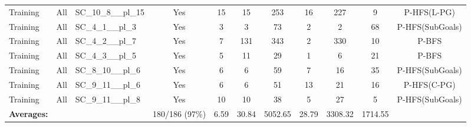 \documentclass{article}
\begin{document}
\begin{tabular}{lllcccccccc}
Training & All & SC\_10\_8\_\_pl\_15 & Yes & 15 & 15 & 253 & 16 & 227 & 9 & P-HFS(L-PG) \\
Training & All & SC\_4\_1\_\_pl\_3 & Yes & 3 & 3 & 73 & 2 & 2 & 68 & P-HFS(SubGoals) \\
Training & All & SC\_4\_2\_\_pl\_7 & Yes & 7 & 131 & 343 & 2 & 330 & 10 & P-BFS \\
Training & All & SC\_4\_3\_\_pl\_5 & Yes & 5 & 11 & 29 & 1 & 6 & 21 & P-BFS \\
Training & All & SC\_8\_10\_\_pl\_6 & Yes & 6 & 6 & 59 & 7 & 16 & 35 & P-HFS(SubGoals) \\
Training & All & SC\_9\_11\_\_pl\_6 & Yes & 6 & 6 & 51 & 13 & 21 & 16 & P-HFS(C-PG) \\
Training & All & SC\_9\_11\_\_pl\_8 & Yes & 10 & 10 & 38 & 5 & 27 & 5 & P-HFS(SubGoals) \\
\textbf{Averages:} & & & 180/186 (97\%) & 6.59 & 30.84 & 5052.65 & 28.79 & 3308.32 & 1714.55 & \\
\bottomrule
\end{tabular}
\newpage
\end{document}
